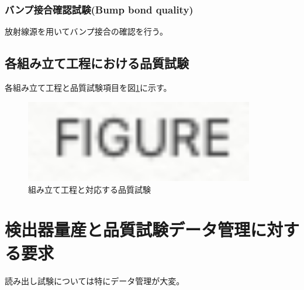 \subsubsection{バンプ接合確認試験(Bump bond quality)}
放射線源を用いてバンプ接合の確認を行う。

\subsection{各組み立て工程における品質試験}

各組み立て工程と品質試験項目を図\ref{stage_test_flow}に示す。
\begin{figure}[bpt]\centering
\includegraphics[width=10cm]{figure}
\caption[組み立て工程と対応する品質試験]{組み立て工程と対応する品質試験}
\label{stage_test_flow}
\end{figure}

\section{検出器量産と品質試験データ管理に対する要求}

読み出し試験については特にデータ管理が大変。
